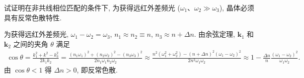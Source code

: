 \documentclass{assignment}
\begin{document}
\begin{prob}
    试证明在非共线相位匹配的条件下, 为获得远红外差频光 ($\omega_1$、$\omega_2\gg\omega_3$), 晶体必须具有反常色散特性.
\end{prob}
\begin{pf}
    为获得远红外差频光, $\omega_1-\omega_2=\omega_3$, $n_1\approx n_2\equiv n$, $n_3\approx n+\Delta n$. 由余弦定理, $\bm{k}_1$ 和 $\bm{k}_2$ 之间的夹角 $\theta$ 满足
    \begin{align}
        \cos\theta=\frac{k_1^2+k^2-k_3^2}{2k_1k_2}=\frac{(n_1\omega_1)^2+(n_2\omega_2)^2-(n_3\omega_3)^2}{2n_1\omega_1n_2\omega_2}\approx\frac{n^2(\omega_1^2+\omega_2^2)-(n+\Delta n)^2(\omega_1-\omega_2)^2}{2n^2\omega_1\omega_2}\approx 1-\frac{\Delta n}{n}\frac{(\omega_1-\omega_2)^2}{\omega_1\omega_2}.
    \end{align}
    由 $\cos\theta<1$ 得 $\Delta n>0$, 即反常色散.
\end{pf}
\end{document}
